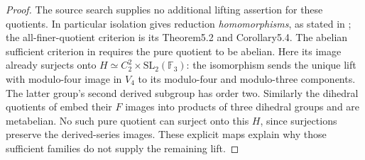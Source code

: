\begin{proof}
The source search supplies no additional lifting assertion
for these quotients. In particular isolation gives reduction
\emph{homomorphisms}, as stated in
\cite[Remark3.16]{dDolgushevGuynee2024}; the all-finer-quotient
criterion is its Theorem5.2 and Corollary5.4.
The abelian sufficient criterion in
\cite[TheoremB.2]{dDolgushevLeLorenz2024} requires the
pure quotient to be abelian. Here its image already
surjects onto
$H\simeq C_2^2\times\mathrm{SL}_2(\mathbb F_3)$:
the isomorphism sends the unique lift with modulo-four
image in $V_4$ to its modulo-four and modulo-three components.
The latter group's second derived subgroup has order two.
Similarly the dihedral quotients of
\cite[Remark3.2]{dBDHP2026} embed their $F$ images into
products of three dihedral groups and are metabelian.
No such pure quotient can surject onto this $H$, since
surjections preserve the derived-series images.
These explicit maps explain why those sufficient families
do not supply the remaining lift.
\end{proof}
